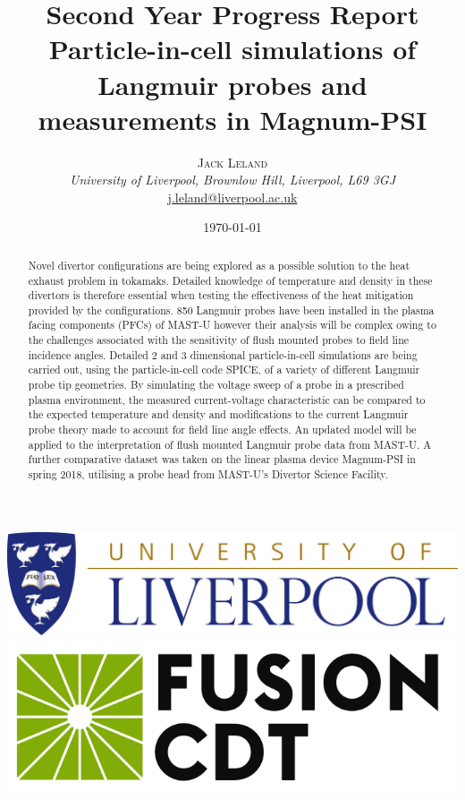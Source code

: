 \documentclass[a4paper, 11pt]{article} %
\title{\textbf{Second Year Progress Report} \\
		Particle-in-cell simulations of Langmuir probes and measurements in Magnum-PSI} %
\author{\textsc{Jack Leland} %
	\\ {\textit{University of Liverpool, Brownlow Hill, Liverpool, L69 3GJ}}
	\\ \href{mailto:j.leland@liverpool.ac.uk}{j.leland@liverpool.ac.uk}
	} %
\date{\today} %
\makeatletter
\renewcommand{\maketitle}{ %
\begin{minipage}{0.3\linewidth}
	\begin{flushleft}
		\vspace{-12ex}
		\hspace{-17pt}\includegraphics[width=1\linewidth]{Logos/Liverpool.jpg} \\
		\vspace{10pt}
		\hspace{-20pt}\includegraphics[width=1\linewidth]{Logos/cdt_logo_text_black.png} \\
		
		
		\vfill
	\end{flushleft}
\end{minipage}
\hfill
\begin{minipage}{0.65\linewidth}
	\begin{flushright} %
		\vspace{-5ex}
		{\LARGE\@title} %
		
		\vspace{10pt} %
		
		{\large\@author} %
		
		\vspace{20pt}
		\@date %
		
	\end{flushright}
\end{minipage}
\vspace{15pt} %
}
\makeatother
\begin{document}
\maketitle %
\thispagestyle{plain}



\begin{abstract}
Novel divertor configurations are being explored as a possible solution to the heat exhaust problem in tokamaks.
Detailed knowledge of temperature and density in these divertors is therefore essential when testing the effectiveness of the heat mitigation provided by the configurations.
850 Langmuir probes have been installed in the plasma facing components (PFCs) of MAST-U however their analysis will be complex owing to the challenges associated with the sensitivity of flush mounted probes to field line incidence angles. 
Detailed 2 and 3 dimensional particle-in-cell simulations are being carried out, using the particle-in-cell code SPICE, of a variety of different Langmuir probe tip geometries.
By simulating the voltage sweep of a probe in a prescribed plasma environment, the measured current-voltage characteristic can be compared to the expected temperature and density and modifications to the current Langmuir probe theory made to account for field line angle effects.
An updated model will be applied to the interpretation of flush mounted Langmuir probe data from MAST-U.
A further comparative dataset was taken on the linear plasma device Magnum-PSI in spring 2018, utilising a probe head from MAST-U's Divertor Science Facility.

\end{abstract}

\end{document}
